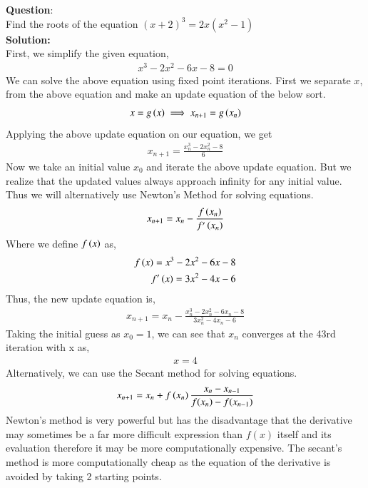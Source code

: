 \documentclass[journal]{IEEEtran}
\begin{document}
	
\textbf{Question}:\\
Find the roots of the equation \( (x + 2)^3 = 2x (x^2 - 1) \)
\\
\textbf{Solution: }\\
First, we simplify the given equation,
\begin{align}
	x^3 -2x^2 - 6x - 8 = 0
\end{align}
We can solve the above equation using fixed point iterations. First we separate $x$, from the above equation and make an update equation of the below sort.
\begin{align}
	x = g\left(x\right) \implies x_{n+1} = g\left(x_n\right)
\end{align}
Applying the above update equation on our equation, we get
\begin{align}
	x_{n+1} = 	\frac{x_n^3 -2x_n^2 - 8}{6}
\end{align}
Now we take an initial value $x_0$ and iterate the above update equation. But we realize that the updated values always approach infinity for any initial value. \\
Thus we will alternatively use Newton's Method for solving equations.
\begin{align}
	x_{n+1} = x_n - \frac{f\left(x_n\right)}{f^{\prime}\left(x_n\right)} 
\end{align}
Where we define $f\left(x\right)$ as, 
\begin{align}
	f\left(x\right) = x^3 -2x^2 - 6x - 8 \\
	f^{\prime}\left(x\right) = 3x^2 -4x - 6 
\end{align}
Thus, the new update equation is, 
\begin{align}
	x_{n+1} = x_n - \frac{x_n^3 -2x_n^2 - 6x_n - 8}{3x_n^2 -4x_n - 6 } 
\end{align}
Taking the initial guess as $x_0 = 1$, we can see that $x_n$ converges at the 43rd iteration with x as,
\begin{align}
	x = 4
\end{align}
Alternatively, we can use the Secant method for solving equations.
\begin{align}
	x_{n+1} = x_n + f\left(x_n\right)\frac{x_{n} -  x_{n-1}}{f(x_{n}) -  f(x_{n-1})}
\end{align}
Newton's method is very powerful but has the disadvantage that the derivative may sometimes be a far more difficult expression than \(f(x)\) itself and its evaluation therefore it may be more computationally expensive. The secant's method is more computationally cheap as the equation of the derivative is avoided by taking 2 starting points.\\ 
\end{document}
